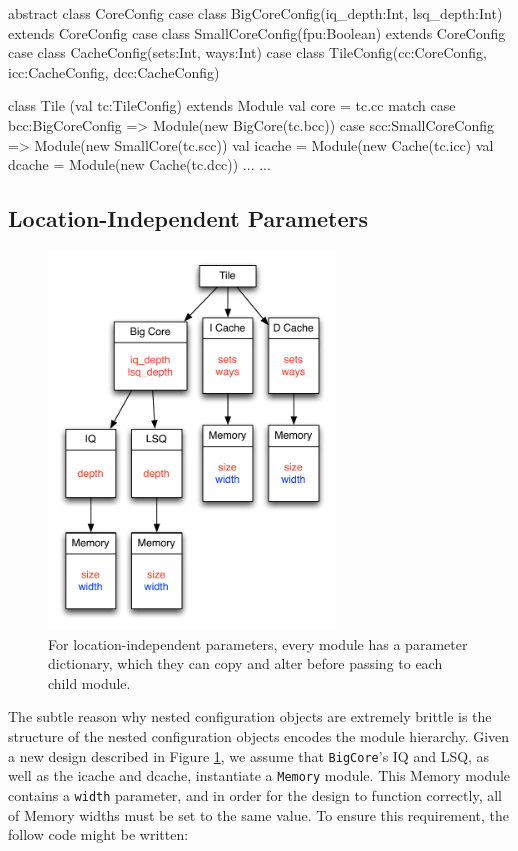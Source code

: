 \documentclass[10pt,twocolumn]{article}
\def\code#1{{\small\tt #1}}
\begin{document}
\begin{scala}
abstract class CoreConfig {}
case class BigCoreConfig(iq_depth:Int, lsq_depth:Int) extends CoreConfig
case class SmallCoreConfig(fpu:Boolean) extends CoreConfig
case class CacheConfig(sets:Int, ways:Int)
case class TileConfig(cc:CoreConfig, icc:CacheConfig, dcc:CacheConfig)

class Tile (val tc:TileConfig) extends Module { 
  val core = tc.cc match {
    case bcc:BigCoreConfig => Module(new BigCore(tc.bcc))
    case scc:SmallCoreConfig => Module(new SmallCore(tc.scc))
  }
  val icache = Module(new Cache(tc.icc)
  val dcache = Module(new Cache(tc.dcc))
  ... 
}
...
\end{scala}
  
\subsection{Location-Independent Parameters}

\begin{figure}[h]
\centering
\includegraphics[width=3in]{figs/ex3.pdf}
\caption{For location-independent parameters, every module has a parameter dictionary, which they can copy and alter before passing to each child module.}
\label{fig:ex3}
\end{figure}

The subtle reason why nested configuration objects are extremely brittle is the structure of the nested configuration objects encodes the module hierarchy. Given a new design described in Figure \ref{fig:ex3}, we assume that \code{BigCore}'s IQ and LSQ, as well as the icache and dcache, instantiate a \code{Memory} module. This Memory module contains a \code{width} parameter, and in order for the design to function correctly, all of Memory widths must be set to the same value. To ensure this requirement, the follow code might be written:
\end{document}
